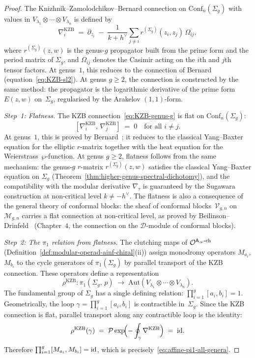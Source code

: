 \begin{proof}
The Knizhnik--Zamolodchikov--Bernard connection on
$\mathrm{Conf}_n(\Sigma_g)$ with values in
$V_{\lambda_1} \otimes \cdots \otimes V_{\lambda_n}$
is defined by
\begin{equation}\label{eq:KZB-genus-g}
\nabla_i^{\mathrm{KZB}}
\;=\;
\partial_{z_i}
\;-\;
\frac{1}{k + h^\vee}
\sum_{j \ne i}
r^{(\Sigma_g)}(z_i, z_j)\, \Omega_{ij},
\end{equation}
where $r^{(\Sigma_g)}(z,w)$ is the genus-$g$ propagator
built from the prime form and the period matrix of
$\Sigma_g$, and $\Omega_{ij}$ denotes the Casimir
acting on the $i$th and $j$th tensor factors.
At genus~$1$, this reduces to the connection of
Bernard~\cite{Ber88}
\textup{(}equation~\eqref{eq:KZB-sl2}\textup{)}.
At genus $g \ge 2$, the connection is constructed by
the same method: the propagator is the logarithmic
derivative of the prime form $E(z,w)$ on~$\Sigma_g$,
regularised by the Arakelov $(1,1)$-form.

\medskip\noindent
\emph{Step~1: Flatness.}
The KZB connection~\eqref{eq:KZB-genus-g} is flat
on $\mathrm{Conf}_n(\Sigma_g)$:
\[
[\nabla_i^{\mathrm{KZB}},\,
 \nabla_j^{\mathrm{KZB}}]
\;=\; 0
\quad \text{for all } i \ne j.
\]
At genus~$1$, this is proved by
Bernard~\cite{Ber88}; it reduces to the classical
Yang--Baxter equation for the elliptic $r$-matrix
together with the heat equation for the
Weierstrass~$\wp$-function.
At genus $g \ge 2$, flatness follows from the same
mechanism: the genus-$g$ $r$-matrix
$r^{(\Sigma_g)}(z,w)$ satisfies the classical
Yang--Baxter equation on $\Sigma_g$
\textup{(}Theorem~\ref{thm:higher-genus-spectral-dichotomy}\textup{)},
and the compatibility with the modular
derivative $\nabla_\tau$ is guaranteed by the
Sugawara construction at non-critical level
$k \ne -h^\vee$.
The flatness is also a consequence of the general
theory of conformal blocks: the sheaf of conformal
blocks~$\mathcal{V}_{g,n}$ on $\mathcal{M}_{g,n}$
carries a flat connection at non-critical level,
as proved by Beilinson--Drinfeld~\cite{BD04}
\textup{(}Chapter~$4$, the connection on the
$\mathcal{D}$-module of conformal blocks\textup{)}.

\medskip\noindent
\emph{Step~2: The $\pi_1$ relation from flatness.}
The clutching maps of
$\mathcal{O}^{\mathsf{A}_{\infty}\text{-ch}}$
\textup{(}Definition~\ref{def:modular-operad-ainf-chiral}(ii)\textup{)}
assign monodromy operators $M_{a_i}$, $M_{b_i}$
to the cycle generators of $\pi_1(\Sigma_g)$ by
parallel transport of the KZB connection.
These operators define a representation
\[
\rho^{\mathrm{KZB}}\colon
\pi_1(\Sigma_g,\, p)
\;\longrightarrow\;
\mathrm{Aut}(V_{\lambda_1}
\otimes \cdots \otimes V_{\lambda_n}).
\]
The fundamental group of $\Sigma_g$ has a single
defining relation:
$\prod_{i=1}^g [a_i, b_i] = 1$.
Geometrically, the loop
$\gamma = \prod_{i=1}^g [a_i, b_i]$ is
contractible in~$\Sigma_g$.
Since the KZB connection is flat, parallel transport
along any contractible loop is the identity:
\[
\rho^{\mathrm{KZB}}(\gamma)
\;=\;
\mathcal{P}\exp\!\Bigl(
-\oint_\gamma \nabla^{\mathrm{KZB}}
\Bigr)
\;=\;
\mathrm{id}.
\]
Therefore
$\prod_{i=1}^g [M_{a_i}, M_{b_i}] = \mathrm{id}$,
which is
precisely~\eqref{eq:affine-pi1-all-genera}.


\end{proof}
